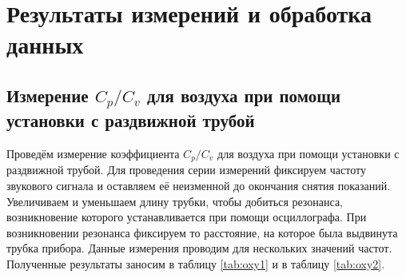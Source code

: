 \documentclass[a4paper, 12pt]{article}
\begin{document}
    \section*{Результаты измерений и обработка данных}
    
        \subsection*{Измерение $C_p/C_v$ для воздуха при помощи установки с раздвижной трубой}

            \noindent Проведём измерение коэффициента $C_p/C_v$ для воздуха при помощи установки с раздвижной трубой. Для проведения серии измерений фиксируем частоту звукового сигнала и оставляем её неизменной до окончания снятия показаний. Увеличиваем и уменьшаем длину трубки, чтобы добиться резонанса, возникновение которого устанавливается при помощи осциллографа. При возникновении резонанса фиксируем то расстояние, на которое была выдвинута трубка прибора. Данные измерения проводим для нескольких значений частот. Полученные результаты заносим в таблицу \ref{tab:oxy1} и в таблицу \ref{tab:oxy2}.
\end{document}
